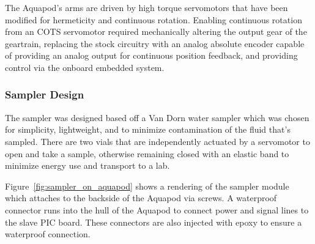 The Aquapod's arms are driven by high torque servomotors that have been modified for hermeticity and continuous rotation. Enabling continuous rotation from an COTS servomotor required mechanically altering the output gear of the geartrain, replacing the stock circuitry with an analog absolute encoder capable of providing an analog output for continuous position feedback, and providing control via the onboard embedded system. 



\subsubsection{Sampler Design}
The sampler was designed based off a Van Dorn water sampler which was chosen for simplicity, lightweight, and to minimize contamination of the fluid that's sampled. There are two vials that are independently actuated by a servomotor to open and take a sample, otherwise remaining closed with an elastic band to minimize energy use and transport to a lab. 

Figure~\ref{fig:sampler_on_aquapod} shows a rendering of the sampler module which attaches to the backside of the Aquapod via screws. A waterproof connector runs into the hull of the Aquapod to connect power and signal lines to the slave PIC board.  These connectors are also injected with epoxy to ensure a waterproof connection. 

